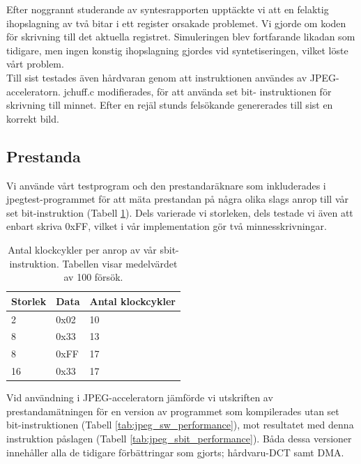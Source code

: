 \documentclass[a4paper]{article}
\begin{document}
Efter noggrannt studerande av syntesrapporten upptäckte vi att en
felaktig ihopslagning av två bitar i ett register orsakade problemet. Vi
gjorde om koden för skrivning till det aktuella registret. Simuleringen
blev fortfarande likadan som tidigare, men ingen konstig ihopslagning
gjordes vid syntetiseringen, vilket löste vårt problem.\\

Till sist testades även hårdvaran genom att instruktionen användes av
JPEG-acceleratorn. jchuff.c modifierades, för att använda set bit-
instruktionen för skrivning till minnet. Efter en rejäl stunds
felsökande genererades till sist en korrekt bild.\\


\subsection{Prestanda}

Vi använde vårt testprogram och den prestandaräknare som inkluderades i
jpegtest-programmet för att mäta prestandan på några olika slags anrop
till vår set bit-instruktion (Tabell \ref{tab:sbit_performance}). Dels
varierade vi storleken, dels testade vi även att enbart skriva 0xFF,
vilket i vår implementation gör två minnesskrivningar.\\

\begin{table}[ht]
    \centering
    \begin{tabular}{l l l}
        Storlek &  Data  &   Antal klockcykler\\
        \hline
        2       &  0x02  &   10\\
        8       &  0x33  &   13\\
        8       &  0xFF  &   17\\
        16      &  0x33  &   17\\
    \end{tabular}
    \caption{ Antal klockcykler per anrop av vår sbit-instruktion.
              Tabellen visar medelvärdet av 100 försök. }
    \label{tab:sbit_performance}
\end{table}

Vid användning i JPEG-acceleratorn jämförde vi utskriften av
prestandamätningen för en version av programmet som kompilerades utan
set bit-instruktionen (Tabell \ref{tab:jpeg_sw_performance}), mot
resultatet med denna instruktion påslagen (Tabell
\ref{tab:jpeg_sbit_performance}). Båda dessa versioner innehåller alla
de tidigare förbättringar som gjorts; hårdvaru-DCT samt DMA.
\end{document}
